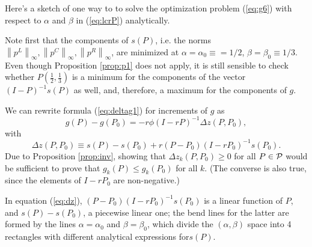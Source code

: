 \documentclass[12pt]{article}
\newcommand{\inorm}[1]{\left\|{#1}\right\|_\infty}
\begin{document}
Here's a sketch of one way to to solve the optimization problem (\ref{eq:g6}) with respect to $\alpha$ and $\beta$ in (\ref{eq:lcrP}) analytically.

Note first that the components of $s(P)$, i.e. the norms $\inorm{p^L},  \inorm{p^C}, \inorm{p^R}$, are minimized at $\alpha=\alpha_0\equiv=1/2$,
$\beta=\beta_0 \equiv 1/3$. Even though  Proposition \ref{prop:p1} does not apply, it is still sensible to check whether $P(\frac{1}{2}, \frac{1}{3})$ is a minimum for the components of the vector $(I-P)^{-1} s(P)$ as well, and, therefore, a maximum for the components of $g$.

We can rewrite  formula (\ref{eq:deltag1}) for increments of $g$ as 
$$
g(P) - g(P_0) = - r \phi  (I - rP)^{-1} \Delta z(P,P_0), 
$$
with 
\begin{equation}
\label{eq:dz}
\Delta z(P,P_0) \equiv s(P)  - s(P_0)  +  r(P-P_0) (I - rP_0)^{-1}s(P_0).
\end{equation}
Due to Proposition \ref{prop:inv}, showing that $\Delta z_k(P,P_0) \ge 0$ for all $P\in \cal{P}$ would be sufficient to prove that $g_k(P)\le g_k(P_0)$ for all $k$. (The converse is also true, since the elements of $I-rP_0$ are non-negative.)

In equation (\ref{eq:dz}), $(P-P_0) (I - rP_0)^{-1}s(P_0)$ is a linear function of $P$, and $s(P)  - s(P_0)$, a piecewise linear one; the bend lines for the latter are formed by the lines  $\alpha=\alpha_0$ and  $\beta=\beta_0$, which divide the $(\alpha, \beta)$ space into 4 rectangles with different analytical expressions for$s(P)$. 
\end{document}
